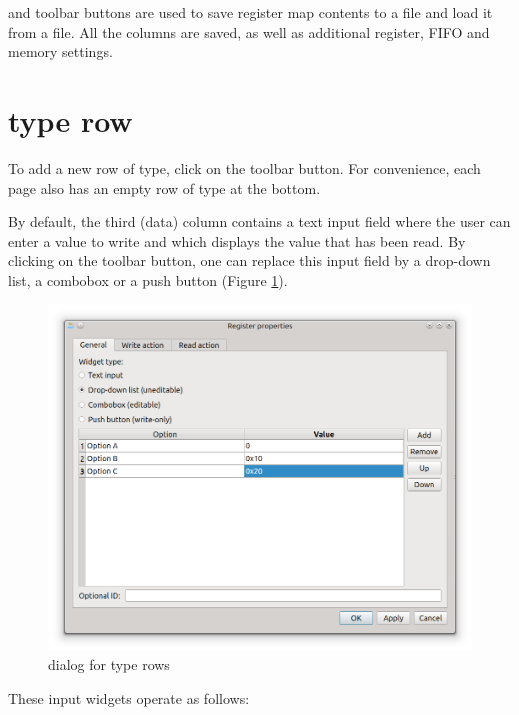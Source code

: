 \documentclass[a4paper,12pt,twoside,extrafontsizes]{memoir}
\begin{document}
 and  toolbar buttons are used to save register map contents to a file and load it from a file. All the columns are saved, as well as additional register, FIFO and memory settings.

\section[Register type row]{ type row}

To add a new row of  type, click on the  toolbar button. For convenience, each page also has an empty row of  type at the bottom.

By default, the third (data) column contains a text input field where the user can enter a value to write and which displays the value that has been read. By clicking on the  toolbar button, one can replace this input field by a drop-down list, a combobox or a push button (Figure \ref{fig:registermapreg}).

\begin{figure}[htbp]
\centering
\includegraphics[scale=0.7]{images/registermapreg.png}
\caption{ dialog for  type rows}
\label{fig:registermapreg}
\end{figure}

These input widgets operate as follows:
\end{document}
